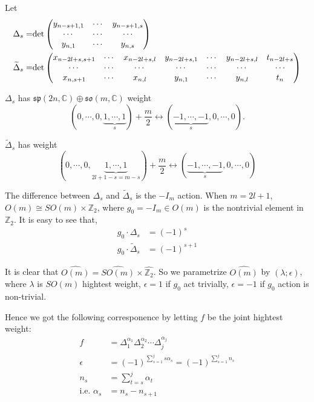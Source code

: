 \documentclass[12pt]{amsart}
\def\bZ{{\mathbb{Z}}}
\def\bC{{\mathbb{C}}}
\def\det{{\rm det}}
\def\tDelta{\widetilde{\Delta}}
\def\aso{\mathfrak{so}}
\def\asp{\mathfrak{sp}}
\begin{document}
Let 
\begin{align*}
\Delta_s =& \det\begin{pmatrix}
y_{n-s+1,1} & \cdots & y_{n-s+1, s} \\
\cdots & \cdots & \cdots \\
y_{n,1} & \cdots & y_{n,s}
\end{pmatrix}\\
\tDelta_s = & \det\begin{pmatrix}
x_{n-2l+s, s+1} & \cdots & x_{n-2l+s,l} & y_{n-2l+s,1} & \cdots & y_{n-2l+s,l}&t_{n-2l+s}\\
\cdots&\cdots&\cdots&\cdots&\cdots&\cdots &\cdots \\
x_{n, s+1} & \cdots & x_{n,l} & y_{n,1} & \cdots & y_{n,l}& t_n
\end{pmatrix}
\end{align*}

$\Delta_s$ has $\asp(2n,\bC)\oplus \aso(m,\bC)$ weight 
\[
(0, \cdots, 0, \underbrace{1, \cdots, 1}_s)+\frac{m}{2}
\leftrightarrow
(\underbrace{-1,\cdots, -1}_s, 0,\cdots, 0) .
\]

$\tDelta_s$ has weight
\[
(0, \cdots, 0, \underbrace{1,\cdots, 1}_{2l+1-s=m-s})+\frac{m}{2}
\leftrightarrow (\underbrace{-1,\cdots, -1}_s, 0,\cdots, 0)
\]

The difference between $\Delta_s$ and $\tDelta_s$ is the $-I_m$ action.
When $m=2l+1$, $O(m) \cong SO(m)\times \bZ_2$, where $g_0=-I_m\in O(m)$ 
is the nontrivial element in $\bZ_2$. It is easy to see that, 
\begin{align*}
g_0\cdot \Delta_s &= (-1)^s\\
g_0\cdot \tDelta_s & = (-1)^{s+1}
\end{align*}

It is clear that $\widehat{O(m)} = \widehat{SO(m)}\times \widehat{\bZ_2}$. 
So we parametrize $\widehat{O(m)}$ by $(\lambda; \epsilon)$, where $\lambda$
is $SO(m)$ hightest weight, $\epsilon=1$ if $g_0$ act trivially, $\epsilon=-1$
if $g_0$ action is non-trivial.   

Hence we got the following corresponence by letting $f$ be the joint hightest weight:
\begin{align*}
f &= \Delta_1^{\alpha_1}\Delta_2^{\alpha_2} \cdots \Delta_j^{\alpha_j}\\
\epsilon &= (-1)^{\sum_{s=1}^j s\alpha_s} = (-1)^{\sum_{s=1}^jn_s}\\
n_s &= \sum_{t=s}^j \alpha_t\\
\text{i.e. } \alpha_s &= n_s-n_{s+1}
\end{align*}
\end{document}
